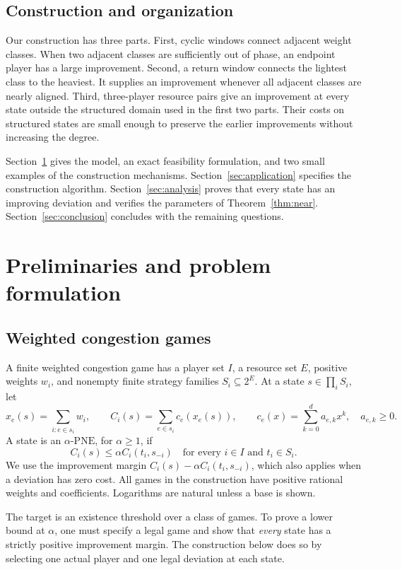 \documentclass[11pt]{article}
\theoremstyle{definition}
\newcommand{\PNE}{\mathrm{PNE}}
\begin{document}
\subsection{Construction and organization}
Our construction has three parts. First, cyclic windows connect adjacent weight classes. When two adjacent classes are sufficiently out of phase, an endpoint player has a large improvement. Second, a return window connects the lightest class to the heaviest. It supplies an improvement whenever all adjacent classes are nearly aligned. Third, three-player resource pairs give an improvement at every state outside the structured domain used in the first two parts. Their costs on structured states are small enough to preserve the earlier improvements without increasing the degree.

Section~\ref{sec:model} gives the model, an exact feasibility formulation, and two small examples of the construction mechanisms. Section~\ref{sec:application} specifies the construction algorithm. Section~\ref{sec:analysis} proves that every state has an improving deviation and verifies the parameters of Theorem~\ref{thm:near}. Section~\ref{sec:conclusion} concludes with the remaining questions.

\section{Preliminaries and problem formulation}\label{sec:model}
\subsection{Weighted congestion games}
A finite weighted congestion game has a player set $I$, a resource set $E$, positive weights $w_i$, and nonempty finite strategy families $S_i\subseteq2^E$. At a state $s\in\prod_iS_i$, let
\[
 x_e(s)=\sum_{i:e\in s_i}w_i,\qquad
 C_i(s)=\sum_{e\in s_i}c_e(x_e(s)),\qquad
 c_e(x)=\sum_{k=0}^d a_{e,k}x^k,\quad a_{e,k}\ge0.
\]
A state is an $\alpha$-$\PNE$, for $\alpha\ge1$, if
\[
 C_i(s)\le\alpha C_i(t_i,s_{-i})
 \quad\text{for every }i\in I\text{ and }t_i\in S_i.
\]
We use the improvement margin $C_i(s)-\alpha C_i(t_i,s_{-i})$, which also applies when a deviation has zero cost. All games in the construction have positive rational weights and coefficients. Logarithms are natural unless a base is shown.

The target is an existence threshold over a class of games. To prove a lower bound at $\alpha$, one must specify a legal game and show that \emph{every} state has a strictly positive improvement margin. The construction below does so by selecting one actual player and one legal deviation at each state.
\end{document}
